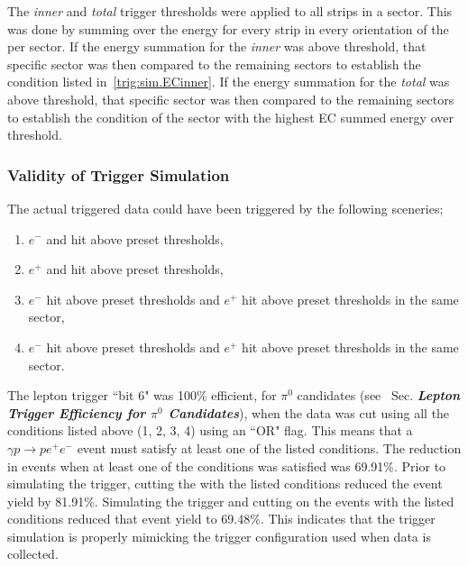 The  \emph{inner} and  \emph{total} trigger thresholds were applied to all  strips in a sector. This was done by summing over the energy for every strip in every orientation of the  per sector. If the energy summation for the  \emph{inner} was above threshold,   that specific sector was then compared to the remaining sectors to establish the condition listed in~\ref{trig:sim.ECinner}. If the energy summation for the  \emph{total} was above threshold, that specific sector was then compared to the remaining sectors to establish the condition of the sector with the highest EC summed energy over threshold.

\subsubsection{Validity of Trigger Simulation}
The actual triggered data could have been triggered by the following sceneries;
\begin{enumerate}\label{trig:get.all}
\item $e^-$  and  hit above preset thresholds,
\item $e^+$  and  hit above preset thresholds,
\item $e^-$  hit above preset thresholds and $e^+$  hit above preset thresholds in the same sector, 
\item $e^-$  hit above preset thresholds and $e^+$  hit above preset thresholds in the same sector. 
\end{enumerate}
The lepton trigger ``bit 6" was 100\% efficient, for $\pi^0$ candidates (see~\cite{clas.thesis.kunkel} Sec. \textit{\textbf{Lepton Trigger Efficiency for $\pi^0$ Candidates}}), when the data was cut using all the conditions listed above (1, 2, 3, 4) using an ``OR" flag. This means that a $\gamma p \to p e^+ e^-$ event must satisfy at least one of the listed conditions. The reduction in events when at least one of the conditions was satisfied was 69.91\%. Prior to simulating the trigger, cutting the  with the listed conditions reduced the event yield by 81.91\%. Simulating the trigger and cutting on the  events with the listed conditions reduced that event yield to 69.48\%. This indicates that the trigger simulation is properly mimicking the trigger configuration used when data is collected. 

%
%




